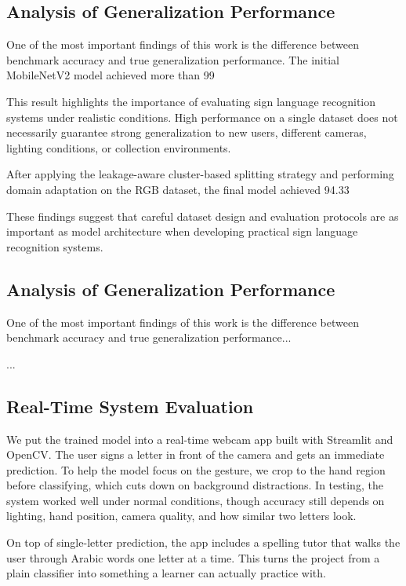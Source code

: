\subsection{Analysis of Generalization Performance}

One of the most important findings of this work is the difference between benchmark accuracy and true generalization performance. The initial MobileNetV2 model achieved more than 99%

This result highlights the importance of evaluating sign language recognition systems under realistic conditions. High performance on a single dataset does not necessarily guarantee strong generalization to new users, different cameras, lighting conditions, or collection environments.

After applying the leakage-aware cluster-based splitting strategy and performing domain adaptation on the RGB dataset, the final model achieved 94.33%

These findings suggest that careful dataset design and evaluation protocols are as important as model architecture when developing practical sign language recognition systems.

\subsection{Analysis of Generalization Performance}

One of the most important findings of this work is the difference between benchmark accuracy and true generalization performance...

...
\subsection{Real-Time System Evaluation}
We put the trained model into a real-time webcam app built with Streamlit and
OpenCV. The user signs a letter in front of the camera and gets an immediate
prediction. To help the model focus on the gesture, we crop to the hand region
before classifying, which cuts down on background distractions. In testing, the
system worked well under normal conditions, though accuracy still depends on
lighting, hand position, camera quality, and how similar two letters look.

On top of single-letter prediction, the app includes a spelling tutor that walks
the user through Arabic words one letter at a time. This turns the project from a
plain classifier into something a learner can actually practice with.